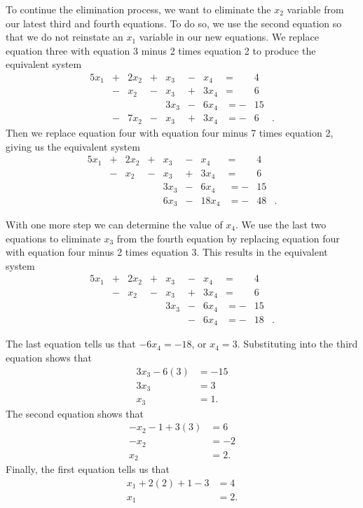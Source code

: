\begin{example}
To continue the elimination process, we want to eliminate the $x_2$ variable from our latest third and fourth equations. To do so, we use the second equation so that we do not reinstate an $x_1$ variable in our new equations. We replace equation three with equation 3 minus 2 times equation 2 to produce the equivalent system
\begin{alignat*}{5}
{}x_1	 	&{}+{}	&{2}x_2 	&{+}		&{}x_3	&{-}	&{}x_4	&= {}&4&{}   \\
{}	 	&{}-{}	&{}x_2 	&{-}		&{}x_3	&{+}	&{3}x_4	&= {}&6&{}   \\
{}	 	&{}{}		&{}		&{ }		&{3}x_3	&{-}	&{6}x_4	&= {-}&15&{}   \\
{}	 	&{}-{}	&{7}x_2 	&{-}		&{}x_3	&{+}	&{3}x_4	&= {-}&6&{.}   
\end{alignat*}
Then we replace equation four with equation four minus 7 times equation 2, giving us the equivalent system
\begin{alignat*}{5}
{}x_1	 	&{}+{}	&{2}x_2 	&{+}		&{}x_3	&{-}	&{}x_4	&= {}&4&{}   \\
{}	 	&{}-{}	&{}x_2 	&{-}		&{}x_3	&{+}	&{3}x_4	&= {}&6&{}   \\
{}	 	&{}{}		&{}		&{ }		&{3}x_3	&{-}	&{6}x_4	&= {-}&15&{}   \\
{}	 	&{}{}		&{}	 	&{ }		&{6}x_3	&{-}	&{18}x_4	&= {-}&48&{.}   
\end{alignat*}

With one more step we can determine the value of $x_4$. We use the last two equations to eliminate $x_3$ from the fourth equation by replacing equation four with equation four minus 2 times equation 3. This results in the equivalent system
\begin{alignat*}{5}
{}x_1	 	&{}+{}	&{2}x_2 	&{+}		&{}x_3	&{-}	&{}x_4	&= {}&4&{}   \\
{}	 	&{}-{}	&{}x_2 	&{-}		&{}x_3	&{+}	&{3}x_4	&= {}&6&{}   \\
{}	 	&{}{}		&{}		&{ }		&{3}x_3	&{-}	&{6}x_4	&= {-}&15&{}   \\
{}	 	&{}{}		&{}	 	&{}		&{}		&{-}	&{6}x_4	&= {-}&18&{.}   
\end{alignat*}

The last equation tells us that $-6x_4 = -18$, or $x_4 =3$. Substituting into the third equation shows that 
\begin{align*}
3x_3 - 6\left(3\right) &= -15 \\
3x_3 &= 3 \\
x_3 &= 1.
\end{align*}
The second equation shows that
\begin{align*}
-x_2 - 1 + 3\left(3\right) &= 6 \\
-x_2 &= -2 \\
x_2 &=2.
\end{align*}
Finally, the first equation tells us that
\begin{align*}
x_1 + 2\left(2\right) + 1 - 3 &= 4 \\
x_1 &= 2. 
\end{align*}


\end{example}
